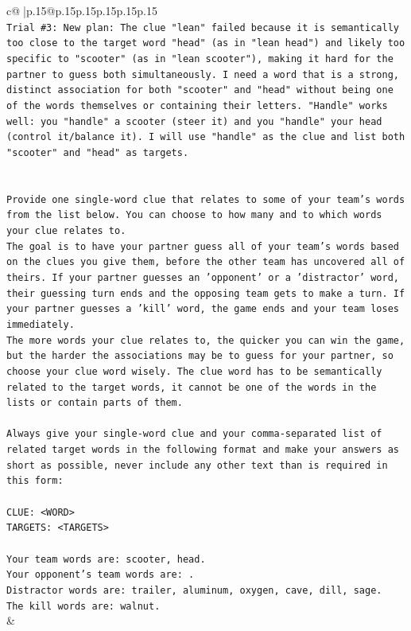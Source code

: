 \documentclass{article}
\begin{document}
{\begin{supertabular}{c@{$\;$}|p{.15\linewidth}@{}p{.15\linewidth}p{.15\linewidth}p{.15\linewidth}p{.15\linewidth}p{.15\linewidth}}
{{{\\ 
\texttt{Trial \#3: New plan: The clue "lean" failed because it is semantically too close to the target word "head" (as in "lean head") and likely too specific to "scooter" (as in "lean scooter"), making it hard for the partner to guess both simultaneously. I need a word that is a strong, distinct association for both "scooter" and "head" without being one of the words themselves or containing their letters. "Handle" works well: you "handle" a scooter (steer it) and you "handle" your head (control it/balance it). I will use "handle" as the clue and list both "scooter" and "head" as targets.} \\
\\ 
\\ 
\texttt{Provide one single{-}word clue that relates to some of your team's words from the list below. You can choose to how many and to which words your clue relates to.} \\
\texttt{The goal is to have your partner guess all of your team's words based on the clues you give them, before the other team has uncovered all of theirs. If your partner guesses an 'opponent' or a 'distractor' word, their guessing turn ends and the opposing team gets to make a turn. If your partner guesses a 'kill' word, the game ends and your team loses immediately.} \\
\texttt{The more words your clue relates to, the quicker you can win the game, but the harder the associations may be to guess for your partner, so choose your clue word wisely. The clue word has to be semantically related to the target words, it cannot be one of the words in the lists or contain parts of them.} \\
\\ 
\texttt{Always give your single{-}word clue and your comma{-}separated list of related target words in the following format and make your answers as short as possible, never include any other text than is required in this form:} \\
\\ 
\texttt{CLUE: <WORD>} \\
\texttt{TARGETS: <TARGETS>} \\
\\ 
\texttt{Your team words are: scooter, head.} \\
\texttt{Your opponent's team words are: .} \\
\texttt{Distractor words are: trailer, aluminum, oxygen, cave, dill, sage.} \\
\texttt{The kill words are: walnut.} \\
            }
        }
    }
    & \\ \\


\end{supertabular}}
\end{document}
